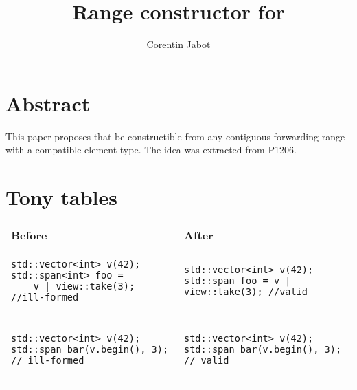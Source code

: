 \documentclass{wg21}
\title{Range constructor for \tcode{std::span}}
\author{Corentin Jabot}{corentin.jabot@gmail.com}
\begin{document}
\maketitle

\section{Abstract}

This paper proposes that  be constructible from any contiguous forwarding-range with a compatible element type.
The idea was extracted from P1206.

\section{Tony tables}
\begin{center}
\begin{tabular}{l|l}
Before & After\\ \hline

\begin{minipage}[t]{0.5\textwidth}
\begin{verbatim}
std::vector<int> v(42);
std::span<int> foo =
    v | view::take(3); //ill-formed
\end{verbatim}
\end{minipage}
&
\begin{minipage}[t]{0.5\textwidth}
\begin{verbatim}
std::vector<int> v(42);
std::span foo = v | view::take(3); //valid
\end{verbatim}
\end{minipage}
\\\\ \hline


\begin{minipage}[t]{0.5\textwidth}
\begin{verbatim}
std::vector<int> v(42);
std::span bar(v.begin(), 3); // ill-formed
\end{verbatim}
\end{minipage}
&
\begin{minipage}[t]{0.5\textwidth}
\begin{verbatim}
std::vector<int> v(42);
std::span bar(v.begin(), 3); // valid

\end{verbatim}
\end{minipage}
\\\\ \hline


\end{tabular}
\end{center}
\end{document}
